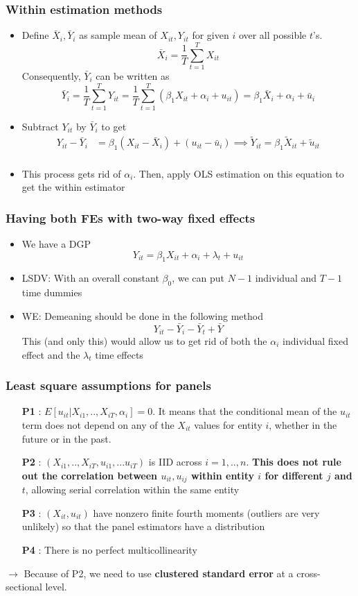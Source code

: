 \documentclass[aspectratio=169]{beamer}
\begin{document}
\begin{frame}
\frametitle{Within estimation methods}
\begin{itemize}
\item Define $\bar{X}_i, \bar{Y}_i$ as sample mean of $X_{it}, Y_{it}$ for given $i$ over all possible $t$'s. 
\[
\bar{X}_i = \frac{1}{T}\sum_{t=1}^TX_{it}
\]
Consequently, $\bar{Y}_i$ can be written as
\[
\bar{Y}_i = \frac{1}{T}\sum_{t=1}^TY_{it}=\frac{1}{T}\sum_{t=1}^T\left(\beta_1 X_{it} +\alpha_i +u_{it}\right)=\beta_1 \bar{X}_i +\alpha_i + \bar{u}_{i}
\]
\item Subtract $Y_{it}$ by $\bar{Y}_i$ to get
\[
\begin{aligned}
Y_{it}-\bar{Y}_i &= \beta_1(X_{it}-\bar{X}_i) + (u_{it}-\bar{u}_i) \implies \tilde{Y}_{it}= \beta_1 \tilde{X}_{it}+\tilde{u}_{it}\\
\end{aligned}
\]
\item This process gets rid of $\alpha_i$. Then, apply OLS estimation on this equation to get the within estimator
\end{itemize}
\end{frame}


\begin{frame}
\frametitle{Having both FEs with two-way fixed effects}
\begin{itemize}
\item We have a DGP
\[
Y_{it}=\beta_1 X_{it} + \alpha_i +\lambda_t + u_{it}
\]
\item LSDV: With an overall constant $\beta_0$, we can put $N-1$ individual and $T-1$ time dummies
\item WE: Demeaning should be done in the following method
\[
Y_{it}-\bar{Y}_i -\bar{Y}_t +\bar{Y}
\]
This (and only this) would allow us to get rid of both the $\alpha_i$ individual fixed effect and the $\lambda_t$ time effects
\end{itemize}
\end{frame}


\begin{frame}
\frametitle{Least square assumptions for panels}

\begin{itemize}
\item  [\textbf{P1}]: $E[u_{it}|X_{i1},..,X_{iT},\alpha_i]=0$. It means that the conditional mean of the $u_{it}$ term does not depend on any of the $X_{it}$ values for entity $i$, whether in the future or in the past. 
\item [\textbf{P2}]: $(X_{i1},..,X_{iT},u_{i1},...u_{iT})$ is IID across $i=1,..,n$. \textbf{This does not rule out the correlation between $u_{it},u_{ij}$ within entity $i$ for different $j$ and $t$}, allowing serial correlation within the same entity
 \item[\textbf{P3}]: $(X_{it},u_{it})$ have nonzero finite fourth moments (outliers are very unlikely) so that the panel estimators have a distribution
\item [\textbf{P4}]: There is no perfect multicollinearity
\end{itemize}
$\to$ Because of P2, we need to use \textbf{clustered standard error} at a cross-sectional level.
\end{frame}
\end{document}

